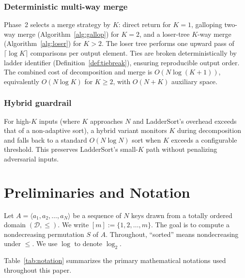 \documentclass[12pt,a4paper]{article}
\theoremstyle{plain}
\theoremstyle{definition}
\begin{document}
\subsubsection{Deterministic multi-way merge}
Phase~2 selects a merge strategy by $K$: direct return for $K=1$, galloping
two-way merge (Algorithm~\ref{alg:gallop}) for $K=2$, and a loser-tree
$K$-way merge (Algorithm~\ref{alg:loser}) for $K > 2$.  The loser tree
performs one upward pass of $\lceil \log K \rceil$ comparisons per output
element.  Ties are broken deterministically by ladder identifier
(Definition~\ref{def:tiebreak}), ensuring reproducible output order.
The combined cost of decomposition and merge is
$O(N\log(K+1))$, equivalently $O(N\log K)$ for $K \ge 2$, with $O(N+K)$ auxiliary space.

\subsubsection{Hybrid guardrail}
For high-$K$ inputs (where $K$ approaches $N$ and LadderSort's overhead
exceeds that of a non-adaptive sort), a hybrid variant monitors $K$ during
decomposition and falls back to a standard $O(N\log N)$ sort when $K$
exceeds a configurable threshold.  This preserves LadderSort's small-$K$
path without penalizing adversarial inputs.

\section{Preliminaries and Notation}
 
Let $A = \langle a_1, a_2, \ldots, a_N \rangle$ be a sequence of $N$ keys drawn from a totally ordered domain $(\mathcal{D},\leq)$. We write $[m] := \{1,2,\ldots,m\}$. The goal is to compute a nondecreasing permutation $S$ of $A$. Throughout, ``sorted'' means nondecreasing under $\leq$. We use $\log$ to denote $\log_2$.
 
Table~\ref{tab:notation} summarizes the primary mathematical notations used throughout this paper.
 
\end{document}
